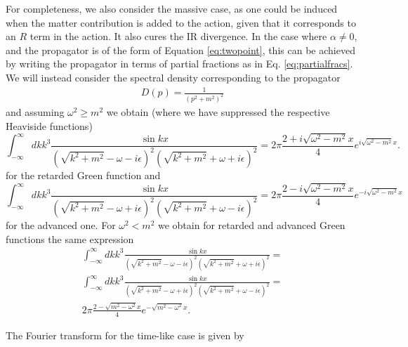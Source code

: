 \documentclass[aps,preprintnumbers,superscriptaddress,longbibliography]{revtex4-1}
\begin{document}
For completeness, we also consider the massive case, as one could be induced when the matter contribution is added to the action, given that it corresponds to an $R$ term in the action. It also cures the IR divergence. In the case where $\alpha\neq 0$, and the propagator is of the form of Equation \eqref{eq:twopoint}, this can be achieved by writing the propagator in terms of partial fractions as in Eq. \eqref{eq:partialfracs}. We will instead consider  the spectral density corresponding to the propagator
\begin{align}
    D(p)= \frac{1}{(p^2+m^2)^2}
\end{align}
and assuming $\omega^2 \geq m^2$ we obtain (where we have suppressed the respective Heaviside functions)
\begin{equation}
    \int^{\infty}_{-\infty} dk k^3 \frac{\sin{kx}}{(\sqrt{k^2+m^2}-\omega-i\epsilon)^2(\sqrt{k^2+m^2}+\omega+i\epsilon)^2}=2 \pi \frac{2+i \sqrt{\omega^2-m^2}x}{4} e^{i \sqrt{\omega^2-m^2}x}.
    \label{eq:retardedSD}
\end{equation}
for the retarded Green function and
\begin{equation}
    \int^{\infty}_{-\infty} dk k^3 \frac{\sin{kx}}{(\sqrt{k^2+m^2}-\omega+i\epsilon)^2(\sqrt{k^2+m^2}+\omega-i\epsilon)^2}=2 \pi \frac{2-i \sqrt{\omega^2-m^2}x}{4} e^{-i \sqrt{\omega^2-m^2}x}
    \label{eq:retardedSD}
\end{equation}
for the advanced one.
For $\omega^2 < m^2$ we obtain for retarded and advanced Green functions the same expression
\begin{eqnarray}
    \int^{\infty}_{-\infty} dk k^3 \frac{\sin{kx}}{(\sqrt{k^2+m^2}-\omega-i\epsilon)^2(\sqrt{k^2+m^2}+\omega+i\epsilon)^2}=\nonumber\\ \int^{\infty}_{-\infty} dk k^3 \frac{\sin{kx}}{(\sqrt{k^2+m^2}-\omega+i\epsilon)^2(\sqrt{k^2+m^2}+\omega-i\epsilon)^2}=\nonumber\\
    2 \pi \frac{2-\sqrt{m^2-\omega^2}x}{4} e^{-\sqrt{m^2-\omega^2}x}.
    \label{eq:retardedSD}
\end{eqnarray}



%


The Fourier transform for the time-like case is given by
\end{document}
